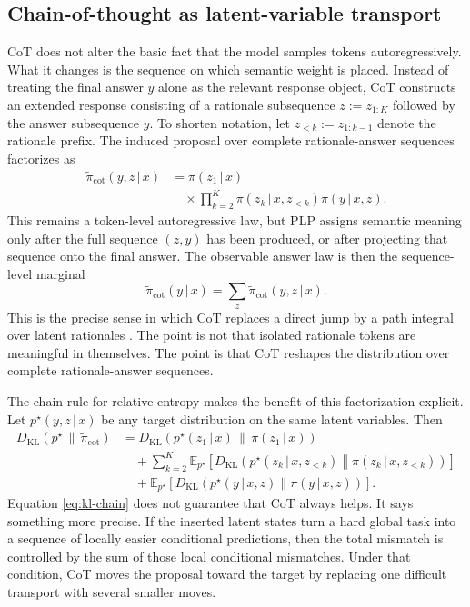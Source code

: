 \documentclass[aps,pre,reprint,superscriptaddress,nofootinbib]{revtex4-2}
\newcommand{\E}{\mathbb{E}}
\newcommand{\KL}{D_{\mathrm{KL}}}
\newcommand{\given}{\,|\,}
\begin{document}
\subsection{Chain-of-thought as latent-variable transport}

CoT does not alter the basic fact that the model samples tokens autoregressively. What it changes is the sequence on which semantic weight is placed. Instead of treating the final answer $y$ alone as the relevant response object, CoT constructs an extended response consisting of a rationale subsequence $z:=z_{1:K}$ followed by the answer subsequence $y$. To shorten notation, let $z_{<k}:=z_{1:k-1}$ denote the rationale prefix. The induced proposal over complete rationale-answer sequences factorizes as
\begin{equation}
\begin{aligned}
\tilde{\pi}_{\mathrm{cot}}(y,z\given x) &= \pi(z_1\given x)
\\
&\quad \times
\prod_{k=2}^{K}\pi(z_k\given x,z_{<k}) \pi(y\given x,z).
\end{aligned}
\label{eq:cot-factorization}
\end{equation}
This remains a token-level autoregressive law, but PLP assigns semantic meaning only after the full sequence $(z,y)$ has been produced, or after projecting that sequence onto the final answer. The observable answer law is then the sequence-level marginal
\begin{equation}
\tilde{\pi}_{\mathrm{cot}}(y\given x)
=
\sum_{z}\tilde{\pi}_{\mathrm{cot}}(y,z\given x).
\label{eq:cot-marginal}
\end{equation}
This is the precise sense in which CoT replaces a direct jump by a path integral over latent rationales \cite{phan2023training,hu2024amortizing}. The point is not that isolated rationale tokens are meaningful in themselves. The point is that CoT reshapes the distribution over complete rationale-answer sequences.

The chain rule for relative entropy makes the benefit of this factorization explicit.
Let $p^\star(y,z\given x)$ be any target distribution on the same latent variables.
Then
\begin{align}
\KL\!\left(p^\star \,\middle\|\, \tilde{\pi}_{\mathrm{cot}}\right)
&=
\KL\!\left(p^\star(z_1\given x)\,\middle\|\,\pi(z_1\given x)\right) \nonumber \\
&\quad + \sum_{k=2}^{K}\E_{p^\star}\!\left[
\KL\!\left(
p^\star(z_k\given x,z_{<k})
\middle\|
\pi(z_k\given x,z_{<k})
\right)\right] \nonumber \\
&\quad + \E_{p^\star}\!\left[
\KL\!\left(
p^\star(y\given x,z)
\middle\|
\pi(y\given x,z)
\right)\right].
\label{eq:kl-chain}
\end{align}
Equation \eqref{eq:kl-chain} does not guarantee that CoT always helps.
It says something more precise.
If the inserted latent states turn a hard global task into a sequence of locally easier conditional predictions, then the total mismatch is controlled by the sum of those local conditional mismatches.
Under that condition, CoT moves the proposal toward the target by replacing one difficult transport with several smaller moves.
\end{document}
